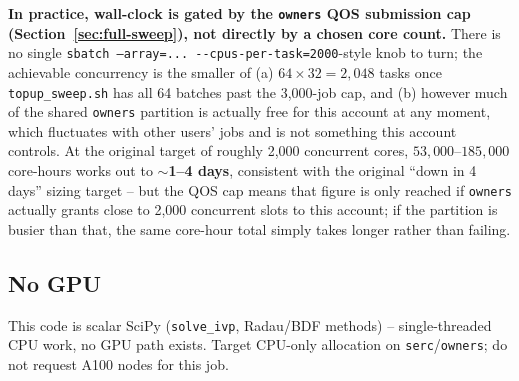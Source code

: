 \documentclass[11pt]{article}
\begin{document}
\textbf{In practice, wall-clock is gated by the \texttt{owners} QOS submission cap
(Section~\ref{sec:full-sweep}), not directly by a chosen core count.} There is no single
\texttt{sbatch --array=... -\/-cpus-per-task=2000}-style knob to turn; the achievable concurrency
is the smaller of (a) $64 \times 32 = 2{,}048$ tasks once \texttt{topup\_sweep.sh} has all 64
batches past the 3,000-job cap, and (b) however much of the shared \texttt{owners} partition is
actually free for this account at any moment, which fluctuates with other users' jobs and is not
something this account controls. At the original target of roughly 2,000 concurrent cores,
$53{,}000$--$185{,}000$ core-hours works out to \textbf{$\sim$1--4 days}, consistent with the
original ``down in 4 days'' sizing target -- but the QOS cap means that figure is only reached if
\texttt{owners} actually grants close to 2,000 concurrent slots to this account; if the partition
is busier than that, the same core-hour total simply takes longer rather than failing.

\subsection{No GPU}
This code is scalar SciPy (\texttt{solve\_ivp}, Radau/BDF methods) -- single-threaded CPU work,
no GPU path exists. Target CPU-only allocation on \texttt{serc}/\texttt{owners}; do not request
A100 nodes for this job.
\end{document}
